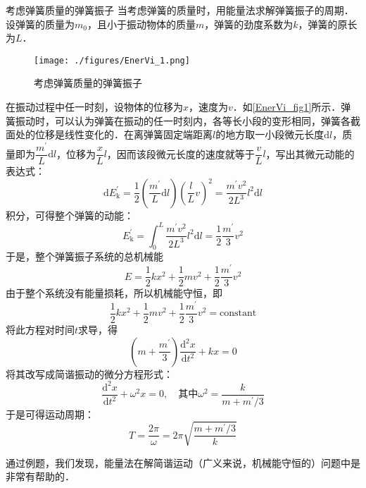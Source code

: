 \begin{example}{考虑弹簧质量的弹簧振子}
当考虑弹簧的质量时，用能量法求解弹簧振子的周期．设弹簧的质量为$m_0$，且小于振动物体的质量$m$，弹簧的劲度系数为$k$，弹簧的原长为$L$．

\begin{figure}[ht]
\centering
\texttt{[image: ./figures/EnerVi\_1.png]}
\caption{考虑弹簧质量的弹簧振子} \label{EnerVi_fig1}
\end{figure}

在振动过程中任一时刻，设物体的位移为$x $，速度为$v$．如\autoref{EnerVi_fig1}所示．弹簧振动时，可以认为弹簧在振动的任一时刻内，各等长小段的变形相同，弹簧各截面处的位移是线性变化的．在离弹簧固定端距离$l$的地方取一小段微元长度$\mathrm dl$，质量即为$\dfrac{m^\prime}{L}\mathrm{d}l$，位移为$\dfrac{x}{L}l$，因而该段微元长度的速度就等于$\dfrac{v}{L}l$，写出其微元动能的表达式：
\begin{equation}
\mathrm{d} E_{\mathrm{k}}^{\prime}=\frac{1}{2}\left(\frac{m^{\prime}}{L} \mathrm{d} l\right)\left(\frac{l}{L} v\right)^{2}=\frac{m^{\prime} v^{2}}{2 L^{3}} l^{2} \mathrm{d} l
\end{equation}
积分，可得整个弹簧的动能：
\begin{equation}
E_{\mathrm{k}}^{\prime}=\int_{0}^{L} \frac{m^{\prime} v^{2}}{2 L^{3}} l^{2} \mathrm{d} l=\frac{1}{2} \frac{m^{\prime}}{3} v^{2}
\end{equation}
于是，整个弹簧振子系统的总机械能
\begin{equation}
E=\frac{1}{2} k x^{2}+\frac{1}{2} m v^{2}+\frac{1}{2} \frac{m^{\prime}}{3} v^{2}
\end{equation}
由于整个系统没有能量损耗，所以机械能守恒，即
\begin{equation}
\frac{1}{2} k x^{2}+\frac{1}{2} m v^{2}+\frac{1}{2} \frac{m^{\prime}}{3} v^{2}=\mathrm{constant}
\end{equation}
将此方程对时间$t $求导，得
\begin{equation}
\left(m+\frac{m^{\prime}}{3}\right) \frac{\mathrm{d}^{2} x}{\mathrm{d} t^{2}}+k x=0
\end{equation}
将其改写成简谐振动的微分方程形式：
\begin{equation}
\frac{\mathrm{d}^{2} x}{\mathrm{d} t^{2}}+\omega^{2} x=0,\quad \text{其中}\omega^{2}=\frac{k}{m+m^{\prime} / 3}
\end{equation}
于是可得运动周期：
\begin{equation}
T=\frac{2 \pi}{\omega}=2 \pi \sqrt{\frac{m+m^{\prime} / 3}{k}}
\end{equation}

\end{example}
通过例题，我们发现，能量法在解简谐运动（广义来说，机械能守恒的）问题中是非常有帮助的．